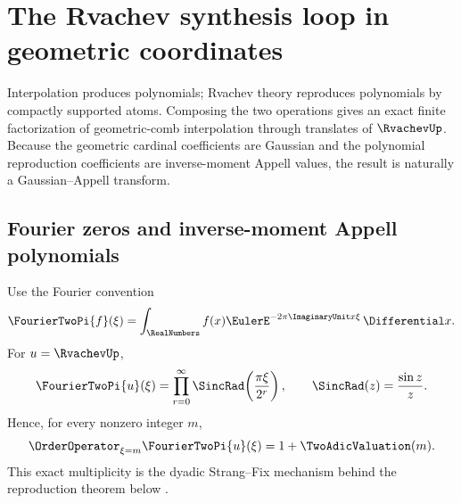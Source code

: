 \section{The Rvachev synthesis loop in geometric coordinates}
\label{gq:chap:rvachev-loop}

Interpolation produces polynomials; Rvachev theory reproduces polynomials
by compactly supported atoms.  Composing the two operations gives an exact
finite factorization of geometric-comb interpolation through translates of
$\RvachevUp$.  Because the geometric cardinal coefficients are Gaussian and the
polynomial reproduction coefficients are inverse-moment Appell values, the
result is naturally a Gaussian--Appell transform.

\subsection{Fourier zeros and inverse-moment Appell polynomials}

Use the Fourier convention
\[
 \FourierTwoPi{f}(\xi)=\int_{\RealNumbers}f(x)\EulerE^{-2\pi\ImaginaryUnit x\xi}\,\Differential x.
\]
For $u=\RvachevUp$,
\begin{equation}
 \FourierTwoPi{u}(\xi)
 =\prod_{r=0}^{\infty}
   \SincRad\!\left(\frac{\pi\xi}{2^r}\right),
 \qquad
 \SincRad(z)=\frac{\sin z}{z}.
 \label{gq:eq:up-fourier-product}
\end{equation}
Hence, for every nonzero integer $m$,
\begin{equation}
 \OrderOperator_{\xi=m}\FourierTwoPi{u}(\xi)=1+\TwoAdicValuation(m).
 \label{gq:eq:up-integer-zero-order}
\end{equation}
This exact multiplicity is the dyadic Strang--Fix mechanism behind the
reproduction theorem below \cite{RvachevRvachev1972,StrangFix1973}.

